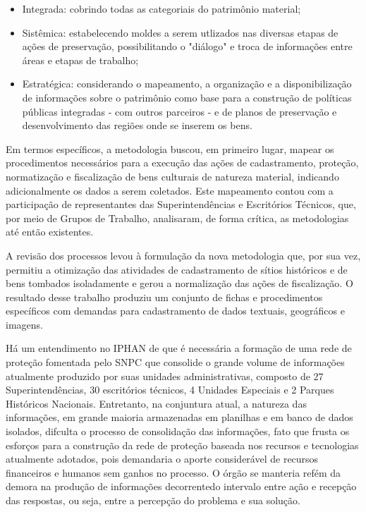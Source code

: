 \begin{itemize}
\item Integrada: cobrindo todas as categoriais do patrimônio material;
\item Sistêmica: estabelecendo moldes a serem utlizados nas diversas etapas de ações de preservação, possibilitando o "diálogo" e troca de informações entre áreas e etapas de trabalho;
\item Estratégica: considerando o mapeamento, a organização e a disponibilização de informações sobre o patrimônio como base para a construção de políticas públicas integradas - com outros parceiros - e de planos de preservação e desenvolvimento das regiões onde se inserem os bens.
\end{itemize}

Em termos específicos, a metodologia buscou, em primeiro lugar, mapear os procedimentos necessários para a execução das ações de cadastramento, proteção, normatização e fiscalização de bens culturais de natureza material, indicando adicionalmente os dados a serem coletados. Este mapeamento contou com a participação de representantes das Superintendências e Escritórios Técnicos, que, por meio de Grupos de Trabalho, analisaram, de forma crítica, as metodologias até então existentes.

A revisão dos processos levou à formulação da nova metodologia que, por sua vez, permitiu a otimização das atividades de cadastramento de sítios históricos e de bens tombados isoladamente e gerou a normalização das ações de fiscalização. O resultado desse trabalho produziu um conjunto de fichas e procedimentos específicos com demandas para cadastramento de dados textuais, geográficos e imagens.

Há um entendimento no IPHAN de que é necessária a formação de uma rede de proteção fomentada pelo SNPC que consolide o grande volume de informações atualmente produzido por suas unidades administrativas, composto de 27 Superintendências, 30 escritórios técnicos, 4 Unidades Especiais e 2 Parques Históricos Nacionais. Entretanto, na conjuntura atual, a natureza das informações, em grande maioria armazenadas em planilhas e em banco de dados isolados, difculta o processo de consolidação das informações, fato que frusta os esforços para a construção da rede de proteção baseada nos recursos e tecnologias atualmente adotados, pois demandaria o aporte considerável de recursos financeiros e humanos sem ganhos no processo. O órgão se manteria refém da demora na produção de informações decorrentedo intervalo entre ação e recepção das respostas, ou seja, entre a percepção do problema e sua solução.

